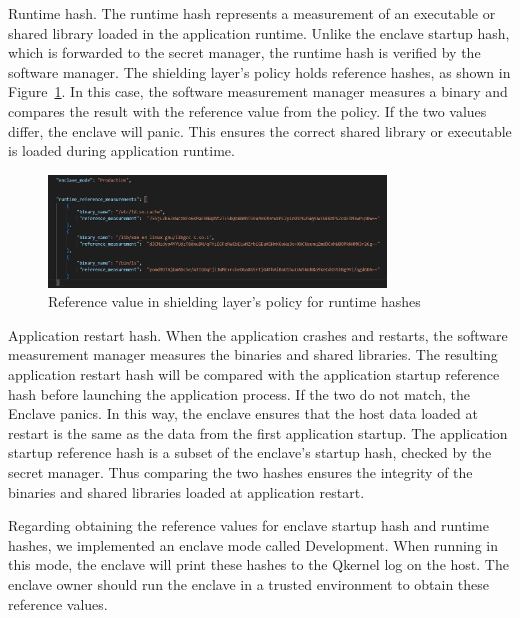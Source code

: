 Runtime hash. The runtime hash represents a measurement of an executable or shared library loaded in the application runtime. Unlike the enclave startup hash, which is forwarded to the secret manager, the runtime hash is verified by the software manager. The shielding layer's policy holds reference hashes, as shown in Figure~\ref{fig:measurement}. In this case, 
the software measurement manager measures a binary and compares the result with the reference value from the policy. If the two values differ, the enclave will panic. This ensures the correct shared library or executable is loaded during application runtime.
\begin{figure}[!htb]
    \centering
    \includegraphics[width=0.8\textwidth]{images/measurement.png}
    \caption[Reference value in shielding layer's policy for runtime hashes]{Reference value in shielding layer's policy for runtime hashes}
    \label{fig:measurement}
\end{figure}

Application restart hash. When the application crashes and restarts, the software measurement manager measures the binaries and shared libraries. The resulting application restart hash will be compared with the application startup reference hash before launching the application process. If the two do not match, the Enclave panics. In this way, the enclave 
ensures that the host data loaded at restart is the same as the data from the first application startup. The application startup reference hash is a subset of the enclave's startup hash, checked by the secret manager. Thus comparing the two hashes ensures the integrity of the binaries and shared libraries loaded at application restart. 

Regarding obtaining the reference values for enclave startup hash and runtime hashes, we implemented an enclave mode called Development. When running in this mode, the enclave will print these hashes to the Qkernel log on the host. The enclave owner should run the enclave in a trusted environment to obtain these reference values.

